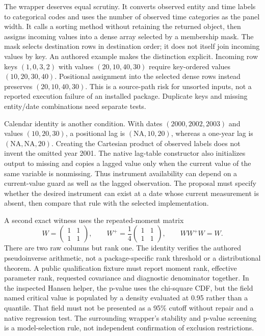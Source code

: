 The wrapper deserves equal scrutiny. It converts observed entity and time labels to categorical codes and uses the number of observed time categories as the panel width. It calls a sorting method without retaining the returned object, then assigns incoming values into a dense array selected by a membership mask. The mask selects destination rows in destination order; it does not itself join incoming values by key. An authored example makes the distinction explicit. Incoming row keys $(1,0,3,2)$ with values $(20,10,40,30)$ require key-ordered values $(10,20,30,40)$. Positional assignment into the selected dense rows instead preserves $(20,10,40,30)$. This is a source-path risk for unsorted inputs, not a reported execution failure of an installed package. Duplicate keys and missing entity/date combinations need separate tests.~\citep{exec25_cdyn_panelvar,exec25_cdyn_choice}

Calendar identity is another condition. With dates $(2000,2002,2003)$ and values $(10,20,30)$, a positional lag is $(\mathrm{NA},10,20)$, whereas a one-year lag is $(\mathrm{NA},\mathrm{NA},20)$. Creating the Cartesian product of observed labels does not invent the omitted year 2001. The native lag-table constructor also initializes output to missing and copies a lagged value only when the current value of the same variable is nonmissing. Thus instrument availability can depend on a current-value guard as well as the lagged observation. The proposal must specify whether the desired instrument can exist at a date whose current measurement is absent, then compare that rule with the selected implementation.~\citep{exec25_cdyn_panelvar,exec25_cdyn_choice}

A second exact witness uses the repeated-moment matrix
\[
 W=\begin{pmatrix}1&1\\1&1\end{pmatrix},\qquad
 W^+=\frac14\begin{pmatrix}1&1\\1&1\end{pmatrix},\qquad WW^+W=W.
\]
There are two raw columns but rank one. The identity verifies the authored pseudoinverse arithmetic, not a package-specific rank threshold or a distributional theorem. A public qualification fixture must report moment rank, effective parameter rank, requested covariance and diagnostic denominator together. In the inspected Hansen helper, the p-value uses the chi-square CDF, but the field named critical value is populated by a density evaluated at 0.95 rather than a quantile. That field must not be presented as a 95\% cutoff without repair and a native regression test. The surrounding wrapper's stability and p-value screening is a model-selection rule, not independent confirmation of exclusion restrictions.~\citep{exec25_cdyn_panelvar,exec25_cdyn_choice}

